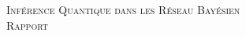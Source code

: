 \documentclass{article}
\author{Thierry Rioual}
\date{}
\begin{document}
\begin{center}
\textsc{\Large Inférence Quantique dans les Réseau Bayésien}
\\[5pt]
\textsc{\large Rapport}  
\end{center}









\printbibliography
\end{document}
